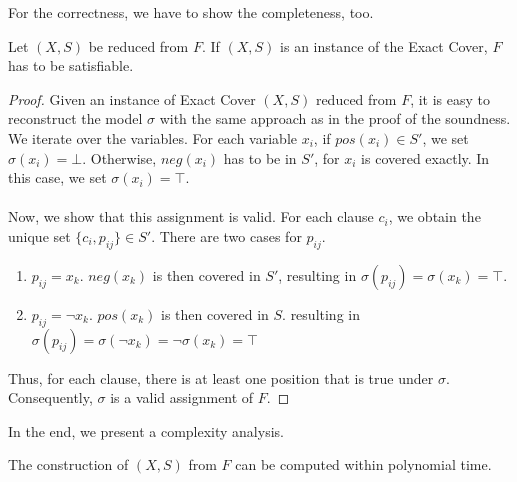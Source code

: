 For the correctness, we have to show the completeness, too.
\begin{lemma}[Completeness]
    Let $(X, S)$ be reduced from $F$. If $(X, S)$ is an instance of the Exact Cover, $F$ has to be satisfiable.
\end{lemma}
\begin{proof}
    Given an instance of Exact Cover $(X, S)$ reduced from $F$, 
    it is easy to reconstruct the model $\sigma$ with the same approach as in the proof of the soundness. 
    We iterate over the variables. For each variable $x_i$, if $pos(x_i) \in S'$, we set $\sigma(x_i) = \bot$. 
    Otherwise, $neg(x_i)$ has to be in $S'$, for $x_i$ is covered exactly. In this case, we set $\sigma(x_i) = \top$. \\\\
    Now, we show that this assignment is valid. For each clause $c_i$, we obtain the unique set $\{c_i, p_{ij}\} \in S'$.
    There are two cases for $p_{ij}$.
    \begin{enumerate}
        \item $p_{ij} = x_k$. $neg(x_k)$ is then covered in $S'$, resulting in $\sigma(p_{ij}) = \sigma(x_k) = \top$.
        \item $p_{ij} = \neg x_k$. $pos(x_k)$ is then covered in $S$. resulting in $\sigma(p_{ij}) = \sigma(\neg x_k) = \neg \sigma(x_k) = \top$
    \end{enumerate}
    Thus, for each clause, there is at least one position that is true under $\sigma$. 
    Consequently, $\sigma$ is a valid assignment of $F$.
\end{proof}
In the end, we present a complexity analysis.
\begin{lemma}
    The construction of $(X, S)$ from $F$ can be computed within polynomial time. 
\end{lemma}
